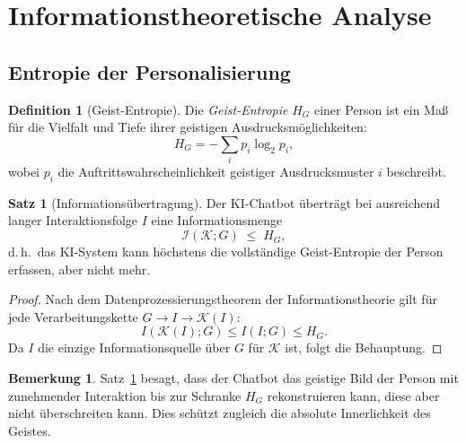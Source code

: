 ﻿\documentclass[a4paper,12pt]{article}
\theoremstyle{definition}
\newtheorem{definition}{Definition}
\newtheorem{satz}{Satz}
\newtheorem{bemerkung}{Bemerkung}
\begin{document}
\section{Informationstheoretische Analyse}

\subsection{Entropie der Personalisierung}

\begin{definition}[Geist-Entropie]
Die \emph{Geist-Entropie} $H_G$ einer Person ist ein Maß für die Vielfalt und Tiefe ihrer
geistigen Ausdrucksmöglichkeiten:
\[
    H_G = -\sum_{i} p_i \log_2 p_i,
\]
wobei $p_i$ die Auftrittswahrscheinlichkeit geistiger Ausdrucksmuster $i$ beschreibt.
\end{definition}

\begin{satz}[Informationsübertragung]
\label{satz:info}
Der KI-Chatbot überträgt bei ausreichend langer Interaktionsfolge $I$ eine Informationsmenge
\[
    \mathcal{I}(\mathcal{K}; G) \;\leq\; H_G,
\]
d.\,h.\ das KI-System kann höchstens die vollständige Geist-Entropie der Person erfassen,
aber nicht mehr.
\end{satz}

\begin{proof}
Nach dem Datenprozessierungstheorem der Informationstheorie \cite{cover2006elements}
gilt für jede Verarbeitungskette $G \to I \to \mathcal{K}(I)$:
\[
    I(\mathcal{K}(I); G) \leq I(I; G) \leq H_G.
\]
Da $I$ die einzige Informationsquelle über $G$ für $\mathcal{K}$ ist, folgt die Behauptung.
\end{proof}

\begin{bemerkung}
Satz~\ref{satz:info} besagt, dass der Chatbot das geistige Bild der Person mit zunehmender
Interaktion bis zur Schranke $H_G$ rekonstruieren kann, diese aber nicht überschreiten kann.
Dies schützt zugleich die absolute Innerlichkeit des Geistes.
\end{bemerkung}
\end{document}
